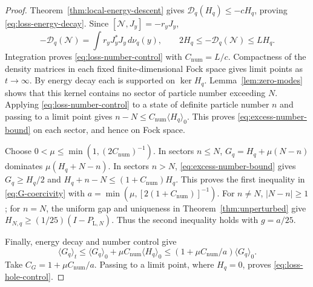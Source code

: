 \begin{proof}
Theorem~\ref{thm:local-energy-descent} gives
$\mathcal D_q(H_q)\le-cH_q$, proving
\eqref{eq:loss-energy-decay}.  Since $[\mathcal N,J_y]=-r_yJ_y$,
\[
 -\mathcal D_q(\mathcal N)=\int r_yJ_y^*J_y\,d\nu_q(y),
 \qquad 2H_q\le-\mathcal D_q(\mathcal N)\le LH_q.
\]
Integration proves \eqref{eq:loss-number-control} with
$C_{\mathrm{num}}=L/c$.
Compactness of the density matrices in each fixed finite-dimensional
Fock space gives limit points as $t\to\infty$.  By energy decay each is
supported on $\ker H_q$.  Lemma~\ref{lem:zero-modes} shows that this kernel
contains no sector of particle number exceeding $N$.  Applying
\eqref{eq:loss-number-control} to a state of definite particle number $n$
and passing to a limit point gives $n-N\le C_{\mathrm{num}}\langle H_q\rangle_0$.
This proves \eqref{eq:excess-number-bound} on each sector, and hence on
Fock space.

Choose $0<\mu\le\min(1,(2C_{\mathrm{num}})^{-1})$.
In sectors $n\le N$, $G_q=H_q+\mu(N-n)$ dominates
$\mu(H_q+N-n)$.  In sectors $n>N$, \eqref{eq:excess-number-bound} gives
$G_q\ge H_q/2$ and $H_q+n-N\le(1+C_{\mathrm{num}})H_q$.
This proves the first inequality in \eqref{eq:G-coercivity} with
$a=\min(\mu,[2(1+C_{\mathrm{num}})]^{-1})$.
For $n\ne N$, $|N-n|\ge1$; for $n=N$, the uniform gap and uniqueness in
Theorem~\ref{thm:unperturbed} give
$H_{N,q}\ge(1/25)(I-P_{\mathrm L,N})$.
Thus the second inequality holds with $g=a/25$.

Finally, energy decay and number control give
\[
 \langle G_q\rangle_t
 \le\langle G_q\rangle_0+\mu C_{\mathrm{num}}\langle H_q\rangle_0
 \le(1+\mu C_{\mathrm{num}}/a)\langle G_q\rangle_0.
\]
Take $C_G=1+\mu C_{\mathrm{num}}/a$.  Passing to a limit point, where
$H_q=0$, proves \eqref{eq:loss-hole-control}.
\end{proof}
